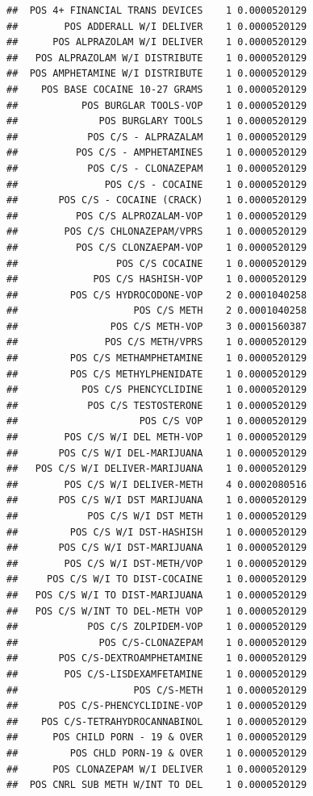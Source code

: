 \documentclass[]{book}
\begin{document}
\begin{verbatim}
##  POS 4+ FINANCIAL TRANS DEVICES    1 0.0000520129
##        POS ADDERALL W/I DELIVER    1 0.0000520129
##      POS ALPRAZOLAM W/I DELIVER    1 0.0000520129
##   POS ALPRAZOLAM W/I DISTRIBUTE    1 0.0000520129
##  POS AMPHETAMINE W/I DISTRIBUTE    1 0.0000520129
##    POS BASE COCAINE 10-27 GRAMS    1 0.0000520129
##           POS BURGLAR TOOLS-VOP    1 0.0000520129
##              POS BURGLARY TOOLS    1 0.0000520129
##            POS C/S - ALPRAZALAM    1 0.0000520129
##          POS C/S - AMPHETAMINES    1 0.0000520129
##            POS C/S - CLONAZEPAM    1 0.0000520129
##               POS C/S - COCAINE    1 0.0000520129
##       POS C/S - COCAINE (CRACK)    1 0.0000520129
##          POS C/S ALPROZALAM-VOP    1 0.0000520129
##        POS C/S CHLONAZEPAM/VPRS    1 0.0000520129
##          POS C/S CLONZAEPAM-VOP    1 0.0000520129
##                 POS C/S COCAINE    1 0.0000520129
##             POS C/S HASHISH-VOP    1 0.0000520129
##         POS C/S HYDROCODONE-VOP    2 0.0001040258
##                    POS C/S METH    2 0.0001040258
##                POS C/S METH-VOP    3 0.0001560387
##               POS C/S METH/VPRS    1 0.0000520129
##         POS C/S METHAMPHETAMINE    1 0.0000520129
##         POS C/S METHYLPHENIDATE    1 0.0000520129
##           POS C/S PHENCYCLIDINE    1 0.0000520129
##            POS C/S TESTOSTERONE    1 0.0000520129
##                     POS C/S VOP    1 0.0000520129
##        POS C/S W/I DEL METH-VOP    1 0.0000520129
##       POS C/S W/I DEL-MARIJUANA    1 0.0000520129
##   POS C/S W/I DELIVER-MARIJUANA    1 0.0000520129
##        POS C/S W/I DELIVER-METH    4 0.0002080516
##       POS C/S W/I DST MARIJUANA    1 0.0000520129
##            POS C/S W/I DST METH    1 0.0000520129
##         POS C/S W/I DST-HASHISH    1 0.0000520129
##       POS C/S W/I DST-MARIJUANA    1 0.0000520129
##        POS C/S W/I DST-METH/VOP    1 0.0000520129
##     POS C/S W/I TO DIST-COCAINE    1 0.0000520129
##   POS C/S W/I TO DIST-MARIJUANA    1 0.0000520129
##   POS C/S W/INT TO DEL-METH VOP    1 0.0000520129
##            POS C/S ZOLPIDEM-VOP    1 0.0000520129
##              POS C/S-CLONAZEPAM    1 0.0000520129
##       POS C/S-DEXTROAMPHETAMINE    1 0.0000520129
##        POS C/S-LISDEXAMFETAMINE    1 0.0000520129
##                    POS C/S-METH    1 0.0000520129
##       POS C/S-PHENCYCLIDINE-VOP    1 0.0000520129
##    POS C/S-TETRAHYDROCANNABINOL    1 0.0000520129
##      POS CHILD PORN - 19 & OVER    1 0.0000520129
##         POS CHLD PORN-19 & OVER    1 0.0000520129
##      POS CLONAZEPAM W/I DELIVER    1 0.0000520129
##  POS CNRL SUB METH W/INT TO DEL    1 0.0000520129

\end{verbatim}
\end{document}

